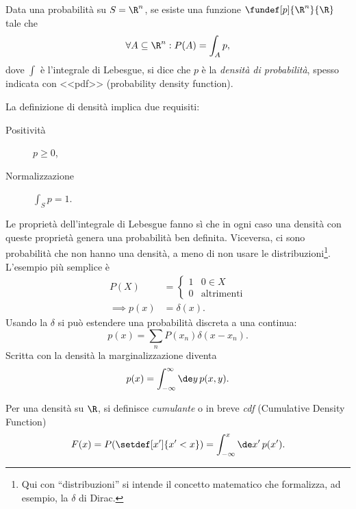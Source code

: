 \begin{definition}
	Data una probabilità su $S=\R^n$, se esiste una funzione $\fundef[p]{\R^n}{\R}$ tale che
	\begin{equation*}
		\forall A\subseteq\R^n : P(A) = \int_A p,
	\end{equation*}
	dove $\int$ è l'integrale di Lebesgue,
	si dice che $p$ è la \emph{densità di probabilità},
	spesso indicata con <<pdf>> (probability density function).
\end{definition}

La definizione di densità implica due requisiti:
\begin{description}
	\item[Positività] $p \ge 0$,
	\item[Normalizzazione] $\int_S p = 1$.
\end{description}
Le proprietà dell'integrale di Lebesgue fanno sì che in ogni caso una densità con queste proprietà genera una probabilità ben definita.
Viceversa, ci sono probabilità che non hanno una densità, a meno di non usare le distribuzioni\footnote{Qui con ``distribuzioni'' si intende il concetto matematico che formalizza, ad esempio, la $\delta$ di Dirac.}.
L'esempio più semplice è
\begin{align*}
	P(X) &= \begin{cases}
		1 & 0 \in X \\
		0 & \text{altrimenti}
	\end{cases} \\
	\implies p(x) &= \delta(x).
\end{align*}
Usando la $\delta$ si può estendere una probabilità discreta a una continua:
\begin{equation*}
	p(x) = \sum_n P(x_n)\delta(x-x_n).
\end{equation*}
Scritta con la densità la marginalizzazione diventa
\begin{equation*}
	p(x) = \int_{-\infty}^\infty \de y\,p(x,y).
\end{equation*}
%

\begin{definition}[Cumulante]
	Per una densità su $\R$, si definisce \emph{cumulante} o in breve \emph{cdf} (Cumulative Density Function)
	\begin{equation*}
		F(x) = P(\setdef[x']{x'<x}) = \int_{-\infty}^x \de x'\,p(x').
	\end{equation*}
\end{definition}

